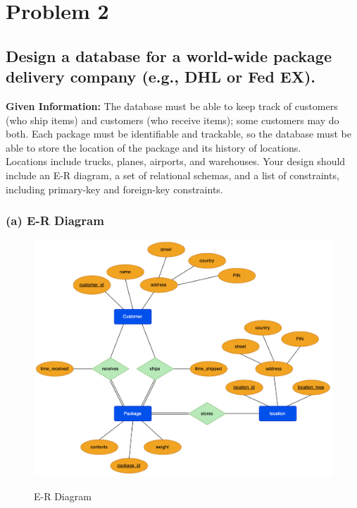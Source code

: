 \documentclass[12pt]{article}
\begin{document}
\newpage

\section{Problem 2}

\subsection*{Design a database for a world-wide package delivery company (e.g., DHL or Fed EX).} 
\textbf{Given Information:} The database must be able to keep track of customers (who ship items) and customers (who receive items); some customers may do both. Each package must be identifiable and trackable, so the database must be able to store the location of the package and its history of locations. \\
Locations include trucks, planes, airports, and warehouses. Your design should include an E-R diagram, a set of relational schemas, and a list of constraints, including primary-key and foreign-key constraints. 

\subsubsection*{(a) E-R Diagram}

\begin{figure}[!hbt]
    \centering
    \includegraphics[scale=0.65]{screenshots/q2_screenshot.png}
    \label{fig:my_label1}
    \caption{E-R Diagram}
\end{figure}
\end{document}
